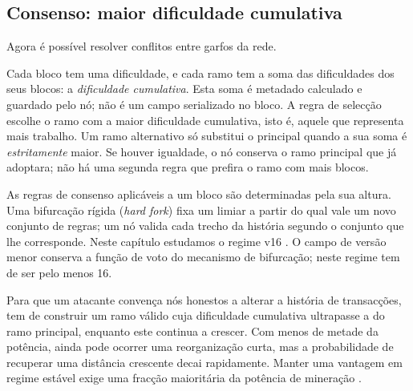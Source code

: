 
\subsection{Consenso: maior dificuldade cumulativa}
Agora é possível resolver conflitos entre garfos da rede.

%
Cada bloco tem uma dificuldade, e cada ramo tem a soma das dificuldades dos
seus blocos: a \emph{dificuldade cumulativa}. Esta soma é metadado calculado e
guardado pelo nó; não é um campo serializado no bloco. A regra de selecção
escolhe o ramo com a maior dificuldade cumulativa, isto é, aquele que
representa mais trabalho. Um ramo alternativo só substitui o principal quando
a sua soma é \emph{estritamente} maior. Se houver igualdade, o nó conserva o
ramo principal que já adoptara; não há uma segunda regra que prefira o ramo
com mais blocos.

%
As regras de consenso aplicáveis a um bloco são determinadas pela sua altura.
Uma bifurcação rígida ({\em hard fork}) fixa um limiar a partir do qual vale
um novo conjunto de regras; um nó valida cada trecho da história segundo o
conjunto que lhe corresponde. Neste capítulo estudamos o regime v16
\cite{monero-source-v16}. O campo de versão menor conserva a função de voto
do mecanismo de bifurcação; neste regime tem de ser pelo menos 16.

Para que um atacante convença nós honestos a alterar a história de
transacções, tem de construir um ramo válido cuja dificuldade cumulativa
ultrapasse a do ramo principal, enquanto este continua a crescer. Com menos de
metade da potência, ainda pode ocorrer uma reorganização curta, mas a
probabilidade de recuperar uma distância crescente decai rapidamente. Manter
uma vantagem em regime estável exige uma fracção maioritária da potência de
mineração \cite{Nakamoto_bitcoin}.


